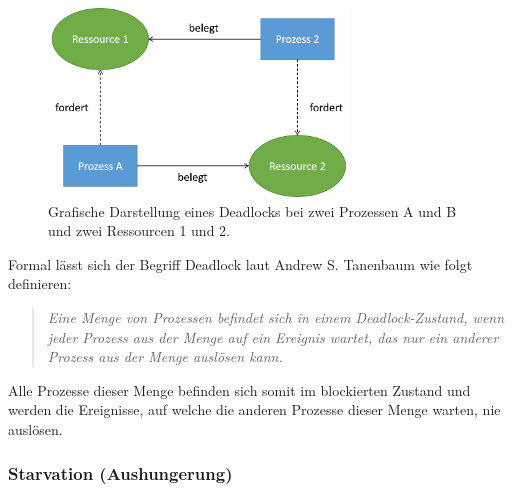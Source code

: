 				\begin{figure}
					\centering	
					\includegraphics[width=8cm]{Abbildungen/Deadlock_Schema.png}
					\caption{Grafische Darstellung eines Deadlocks bei zwei Prozessen A und B und zwei Ressourcen 1 und 2.}
					\label{fig:DeadlockSchema}
				\end{figure}
			
				Formal lässt sich der Begriff Deadlock laut Andrew S. Tanenbaum wie folgt definieren:
				
				\begin{quote}
					\textit{Eine Menge von Prozessen befindet sich in einem Deadlock-Zustand, wenn jeder Prozess aus der Menge auf ein Ereignis wartet, das nur ein anderer Prozess aus der Menge auslösen kann. \cite{ModerneBetriebssysteme}}
				\end{quote}
				
				Alle Prozesse dieser Menge befinden sich somit im blockierten Zustand und werden die Ereignisse, auf welche die anderen Prozesse dieser Menge warten, nie auslösen.
								
			\subsubsection{Starvation (Aushungerung) \cite{ModerneBetriebssysteme}}
			
